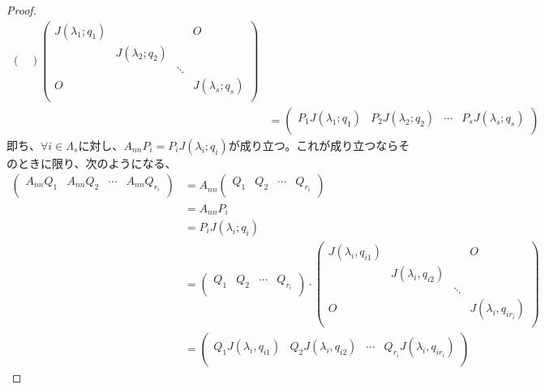 \documentclass[dvipdfmx]{jsarticle}
\begin{document}
\begin{proof}
\begin{align*}
\begin{pmatrix}
\end{pmatrix}\begin{pmatrix}
J\left( \lambda_{1};q_{1} \right) & \  & \  & O \\
\  & J\left( \lambda_{2};q_{2} \right) & \  & \  \\
\  & \  & \ddots & \  \\
O & \  & \  & J\left( \lambda_{s};q_{s} \right) \\
\end{pmatrix}\\
&= \begin{pmatrix}
P_{1}J\left( \lambda_{1};q_{1} \right) & P_{2}J\left( \lambda_{2};q_{2} \right) & \cdots & P_{s}J\left( \lambda_{s};q_{s} \right) \\
\end{pmatrix}
\end{align*}
即ち、$\forall i \in \varLambda_{s}$に対し、$A_{nn}P_{i} = P_{i}J\left( \lambda_{i};q_{i} \right)$が成り立つ。これが成り立つならそのときに限り、次のようになる、
\begin{align*}
\begin{pmatrix}
A_{nn}Q_{1} & A_{nn}Q_{2} & \cdots & A_{nn}Q_{r_{i}} \\
\end{pmatrix} &= A_{nn}\begin{pmatrix}
Q_{1} & Q_{2} & \cdots & Q_{r_{i}} \\
\end{pmatrix}\\
&= A_{nn}P_{i}\\
&= P_{i}J\left( \lambda_{i};q_{i} \right)\\
&= \begin{pmatrix}
Q_{1} & Q_{2} & \cdots & Q_{r_{i}} \\
\end{pmatrix} \cdot \begin{pmatrix}
J\left( \lambda_{i},q_{i1} \right) & \  & \  & O \\
\  & J\left( \lambda_{i},q_{i2} \right) & \  & \  \\
\  & \  & \ddots & \  \\
O & \  & \  & J\left( \lambda_{i},q_{ir_{i}} \right) \\
\end{pmatrix}\\
&= \begin{pmatrix}
Q_{1}J\left( \lambda_{i},q_{i1} \right) & Q_{2}J\left( \lambda_{i},q_{i2} \right) & \cdots & Q_{r_{i}}J\left( \lambda_{i},q_{ir_{i}} \right) \\

\end{pmatrix}
\end{align*}
\end{proof}
\end{document}
